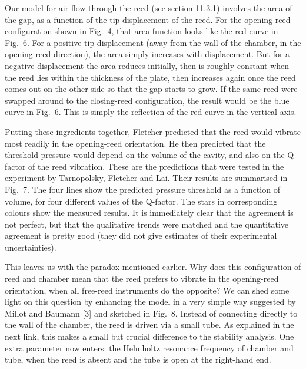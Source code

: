   Our model for air-flow through the reed (see section 11.3.1) involves the 
  area of the gap, as a function of the tip displacement of the reed. For the 
  opening-reed configuration shown in Fig.\ 4, that area function looks like 
  the red curve in Fig.\ 6. For a positive tip displacement (away from the wall 
  of the chamber, in the opening-reed direction), the area simply increases 
  with displacement. But for a negative displacement the area reduces 
  initially, then is roughly constant when the reed lies within the thickness 
  of the plate, then increases again once the reed comes out on the other side 
  so that the gap starts to grow. If the same reed were swapped around to the 
  closing-reed configuration, the result would be the blue curve in Fig.\ 6. 
  This is simply the reflection of the red curve in the vertical axis. 

  Putting these ingredients together, Fletcher predicted that the reed would 
  vibrate most readily in the opening-reed orientation. He then predicted that 
  the threshold pressure would depend on the volume of the cavity, and also on 
  the Q-factor of the reed vibration. These are the predictions that were 
  tested in the experiment by Tarnopolsky, Fletcher and Lai. Their results are 
  summarised in Fig.\ 7. The four lines show the predicted pressure threshold 
  as a function of volume, for four different values of the Q-factor. The stars 
  in corresponding colours show the measured results. It is immediately clear 
  that the agreement is not perfect, but that the qualitative trends were 
  matched and the quantitative agreement is pretty good (they did not give 
  estimates of their experimental uncertainties). 

  This leaves us with the paradox mentioned earlier. Why does this 
  configuration of reed and chamber mean that the reed prefers to vibrate in 
  the opening-reed orientation, when all free-reed instruments do the opposite? 
  We can shed some light on this question by enhancing the model in a very 
  simple way suggested by Millot and Baumann [3] and sketched in Fig.\ 8. 
  Instead of connecting directly to the wall of the chamber, the reed is driven 
  via a small tube. As explained in the next link, this makes a small but 
  crucial difference to the stability analysis. One extra parameter now enters: 
  the Helmholtz resonance frequency of chamber and tube, when the reed is 
  absent and the tube is open at the right-hand end. 

